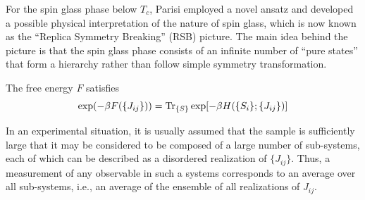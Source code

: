 For the spin glass phase below $T_c$, Parisi\cite{Parisi1980,Parisi-1980b,Parisi-1980a} employed a novel ansatz and 
developed a  possible physical interpretation of the nature of spin glass, 
which is now known as the ``Replica Symmetry Breaking'' (RSB) picture. The main
idea behind the picture is that the spin glass phase consists of an infinite 
number of ``pure states'' that form a hierarchy rather than follow simple symmetry
transformation. 

The free energy $F$ satisfies 
\begin{equation}
  \label{eq:31}
  \exp(-\beta F(\{J_{ij}\}))=\text{Tr}_{\{S\}}\exp[-\beta H(\{S_i\};\{J_{ij}\})]
\end{equation}

In an experimental situation, it is usually assumed that the sample is sufficiently
large that it may be considered to be composed of a large number of sub-systems, 
each of which can be described as a disordered realization of $\{J_{ij}\}$. Thus, a measurement
of any observable in such a systems corresponds to an average over all sub-systems,
i.e., an average of the ensemble of all realizations of $J_{ij}$. 

